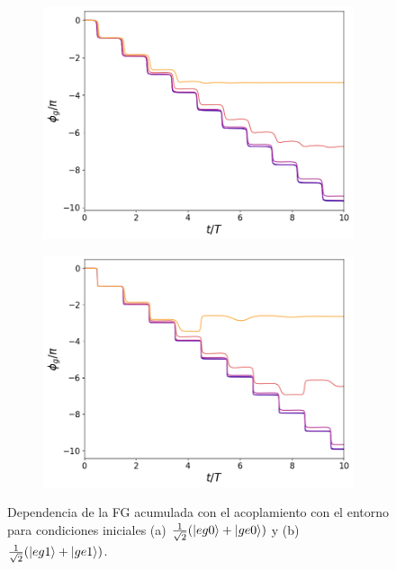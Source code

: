\begin{figure}[h]
    \centering
    \begin{subfigure}{0.49\textwidth}
        \includegraphics[width=\textwidth]{figuras/ch5/dependencia/eg0+/acoplamiento d=0.1g.png}
        \caption{}
        \label{fig5:dependencia acoplamiento eg0}
    \end{subfigure}
    \hfill
    \begin{subfigure}{0.49\textwidth}
        \includegraphics[width=\textwidth]{figuras/ch5/dependencia/eg1+/acoplamiento d=0.1g.png}
        \caption{}
        \label{fig5:dependencia acoplamiento eg1}
    \end{subfigure}
    \caption{Dependencia de la FG acumulada con el acoplamiento con el entorno para condiciones iniciales (a) $\frac{1}{\sqrt{2}}(\ket{eg0}+\ket{ge0})$ y (b) $\frac{1}{\sqrt{2}}(\ket{eg1}+\ket{ge1})$.}
    \label{fig5:dependencia acoplamiento}
\end{figure}
